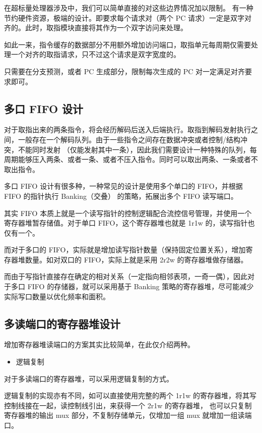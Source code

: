 在超标量处理器涉及中，我们可以简单直接的对这些边界情况加以限制。
有一种节约硬件资源，极端的设计。即要求每个请求对（两个 PC 请求）一定是双字对齐的。此时，取指模块直接将其作为一个双字访问来处理。

如此一来，指令缓存的数据部分不用额外增加访问端口，取指单元每周期仅需要处理一个对齐的取指请求，只不过这个请求是双字宽度的。

只需要在分支预测，或者 PC 生成部分，限制每次生成的 PC 对一定满足对齐要求即可。

\subsection{多口 FIFO 设计}\label{sec:11-advanced-cpu-012}

对于取指出来的两条指令，将会经历解码后送入后端执行。取指到解码发射执行之间，一般存在一个解码队列。由于一些指令之间存在数据冲突或者控制/结构冲突，不能同时发射
（仅能发射其中一条），因此我们需要设计一种特殊的队列，每周期能够压入两条、或者一条、或者不压入指令。同时可以取出两条、一条或者不取出指令。

多口 FIFO 设计有很多种，一种常见的设计是使用多个单口的 FIFO，并根据 FIFO 的指针执行 Banking（交叠） 的策略，拓展出多个 FIFO 读写端口。

其实 FIFO 本质上就是一个读写指针的控制逻辑配合流控信号管理，并使用一个寄存器堆暂存储值。对于单口 FIFO，这个寄存器堆也就是 1r1w 的，读写指针也仅有一个。

而对于多口的 FIFO，实际就是增加读写指针数量（保持固定位置关系），增加寄存器堆数量。如对双口的 FIFO，实际上就是采用 2r2w 的寄存器堆做存储器。

而由于写指针直接存在确定的相对关系（一定指向相邻表项，一奇一偶），因此对于多口 FIFO 的存储器，就可以采用基于 Banking 策略的寄存器堆，尽可能减少实际写口数量以优化频率和面积。

\subsection{多读端口的寄存器堆设计}\label{sec:11-advanced-cpu-013}

增加寄存器堆读端口的方案其实比较简单，在此仅介绍两种。

\begin{itemize}
\tightlist
\item
  逻辑复制
\end{itemize}

对于多读端口的寄存器堆，可以采用逻辑复制的方式。

逻辑复制的实现亦有不同，如可以直接使用完整的两个 1r1w 的寄存器堆，将其写控制线接在一起，读控制线引出，来获得一个 2r1w 的寄存器堆，
也可以只复制寄存器堆的输出 mux 部分，不复制存储单元，仅增加一组 mux 就增加一组读端口。

